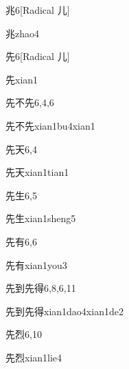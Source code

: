 \begin{entry}{兆}{6}[Radical 儿]
  \begin{phonetics}{兆}{zhao4}
  \end{phonetics}
\end{entry}

\begin{entry}{先}{6}[Radical 儿]
  \begin{phonetics}{先}{xian1}
  \end{phonetics}
\end{entry}

\begin{entry}{先不先}{6,4,6}
  \begin{phonetics}{先不先}{xian1bu4xian1}
  \end{phonetics}
\end{entry}

\begin{entry}{先天}{6,4}
  \begin{phonetics}{先天}{xian1tian1}
  \end{phonetics}
\end{entry}

\begin{entry}{先生}{6,5}
  \begin{phonetics}{先生}{xian1sheng5}
  \end{phonetics}
\end{entry}

\begin{entry}{先有}{6,6}
  \begin{phonetics}{先有}{xian1you3}
  \end{phonetics}
\end{entry}

\begin{entry}{先到先得}{6,8,6,11}
  \begin{phonetics}{先到先得}{xian1dao4xian1de2}
  \end{phonetics}
\end{entry}

\begin{entry}{先烈}{6,10}
  \begin{phonetics}{先烈}{xian1lie4}
  \end{phonetics}
\end{entry}

